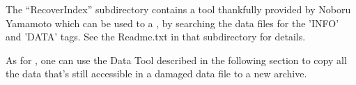 The ``RecoverIndex'' subdirectory contains a tool thankfully provided
by Noboru Yamamoto which can be used to  a ,
by searching the data files for the 'INFO' and 'DATA' tags.
See the Readme.txt in that subdirectory for details.

As for , one can use the Data Tool described in the following
section to copy all the data that's still accessible in a damaged data file
to a new archive.

